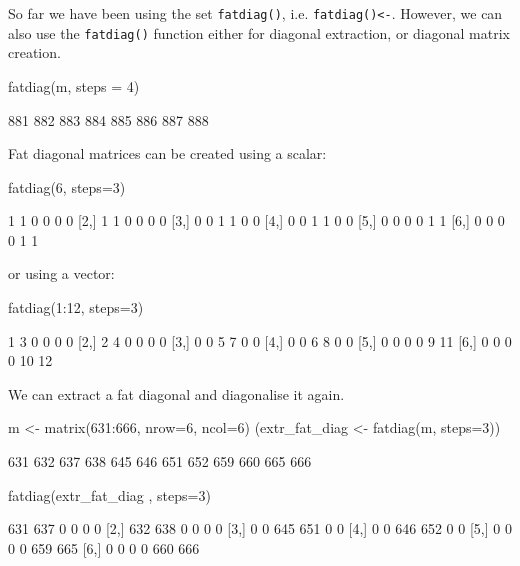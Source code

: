 \documentclass[article]{jss}
\begin{document}
So far we have been using the set \texttt{fatdiag()}, i.e.
\texttt{fatdiag()\textless{}-}. However, we can also use the
\texttt{fatdiag()} function either for diagonal extraction, or diagonal
matrix creation.

\begin{CodeChunk}
\begin{CodeInput}
fatdiag(m, steps = 4)
\end{CodeInput}
\begin{CodeOutput}
[1] 881 882 883 884 885 886 887 888
\end{CodeOutput}
\end{CodeChunk}

Fat diagonal matrices can be created using a scalar:

\begin{CodeChunk}
\begin{CodeInput}
fatdiag(6, steps=3)
\end{CodeInput}
\begin{CodeOutput}
     [,1] [,2] [,3] [,4] [,5] [,6]
[1,]    1    1    0    0    0    0
[2,]    1    1    0    0    0    0
[3,]    0    0    1    1    0    0
[4,]    0    0    1    1    0    0
[5,]    0    0    0    0    1    1
[6,]    0    0    0    0    1    1
\end{CodeOutput}
\end{CodeChunk}

or using a vector:

\begin{CodeChunk}
\begin{CodeInput}
fatdiag(1:12, steps=3)
\end{CodeInput}
\begin{CodeOutput}
     [,1] [,2] [,3] [,4] [,5] [,6]
[1,]    1    3    0    0    0    0
[2,]    2    4    0    0    0    0
[3,]    0    0    5    7    0    0
[4,]    0    0    6    8    0    0
[5,]    0    0    0    0    9   11
[6,]    0    0    0    0   10   12
\end{CodeOutput}
\end{CodeChunk}

We can extract a fat diagonal and diagonalise it again.

\begin{CodeChunk}
\begin{CodeInput}
m <- matrix(631:666, nrow=6, ncol=6)
(extr_fat_diag <- fatdiag(m, steps=3))
\end{CodeInput}
\begin{CodeOutput}
 [1] 631 632 637 638 645 646 651 652 659 660 665 666
\end{CodeOutput}
\begin{CodeInput}
fatdiag(extr_fat_diag , steps=3)
\end{CodeInput}
\begin{CodeOutput}
     [,1] [,2] [,3] [,4] [,5] [,6]
[1,]  631  637    0    0    0    0
[2,]  632  638    0    0    0    0
[3,]    0    0  645  651    0    0
[4,]    0    0  646  652    0    0
[5,]    0    0    0    0  659  665
[6,]    0    0    0    0  660  666
\end{CodeOutput}
\end{CodeChunk}
\end{document}
